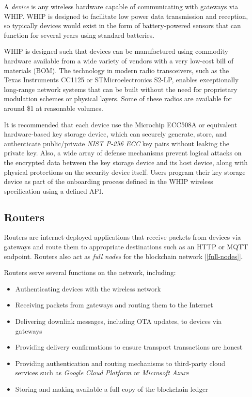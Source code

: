 \documentclass[10pt, nonatbib, nocopyrightspace, reprint]{sigplanconf}
\newcommand{\secref}[1]{[\autoref{#1}]}
\begin{document}
A \emph{device} is any wireless hardware capable of communicating with gateways via WHIP. WHIP is designed to facilitate low power data transmission and reception, so typically devices would exist in the form of battery-powered sensors that can function for several years using standard batteries.

WHIP is designed such that devices can be manufactured using commodity hardware available from a wide variety of vendors with a very low-cost bill of materials (BOM). The technology in modern radio transceivers, such as the Texas Instruments CC1125 or STMicroelectronics S2-LP, enables exceptionally long-range network systems that can be built without the need for proprietary modulation schemes or physical layers. Some of these radios are available for around \$1 at reasonable volumes.

It is recommended that each device use the Microchip ECC508A or equivalent hardware-based key storage device, which can securely generate, store, and authenticate public/private \emph{NIST P-256 ECC} \cite{nist} key pairs without leaking the private key. Also, a wide array of defense mechanisms prevent logical attacks on the encrypted data between the key storage device and its host device, along with physical protections on the security device itself. Users program their key storage device as part of the onboarding process defined in the WHIP wireless specification using a defined API\@.

\subsection{Routers}

Routers are internet-deployed applications that receive packets from devices via gateways and route them to appropriate destinations such as an HTTP or MQTT endpoint. Routers also act as \emph{full nodes} for the blockchain network \secref{full-nodes}.

Routers serve several functions on the network, including:

\begin{itemize}
    \item Authenticating devices with the wireless network
    \item Receiving packets from gateways and routing them to the Internet
    \item Delivering downlink messages, including OTA updates, to devices via gateways
    \item Providing delivery confirmations to ensure transport transactions are honest
    \item Providing authentication and routing mechanisms to third-party cloud services such as \emph{Google Cloud Platform} or \emph{Microsoft Azure}
    \item Storing and making available a full copy of the blockchain ledger
\end{itemize}
\end{document}
